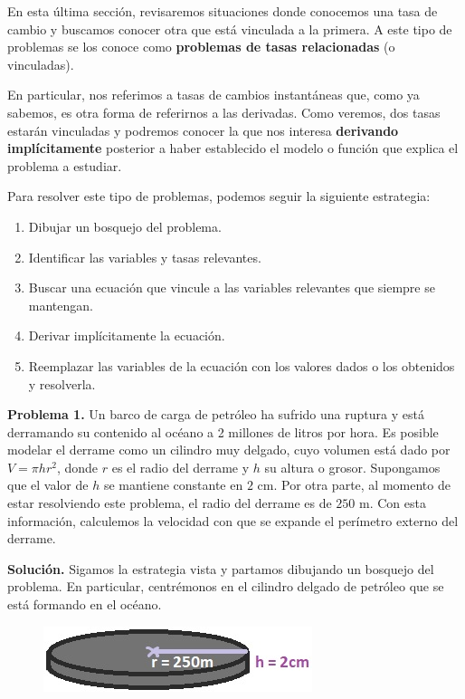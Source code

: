 \documentclass[12pt]{article}
\begin{document}
En esta última sección, revisaremos situaciones donde conocemos una tasa de cambio y buscamos conocer otra que está vinculada a la primera. A este tipo de problemas se los conoce como \textbf{problemas de tasas relacionadas} (o vinculadas).

En particular, nos referimos a tasas de cambios instantáneas que, como ya sabemos, es otra forma de referirnos a las derivadas. Como veremos, dos tasas estarán vinculadas y podremos conocer la que nos interesa \textbf{derivando implícitamente} posterior a haber establecido el modelo o función que explica el problema a estudiar.

Para resolver este tipo de problemas, podemos seguir la siguiente estrategia:

\begin{enumerate}
\item Dibujar un bosquejo del problema.

\item Identificar las variables y tasas relevantes.

\item Buscar una ecuación que vincule a las variables relevantes que siempre se mantengan.

\item Derivar implícitamente la ecuación.

\item Reemplazar las variables de la ecuación con los valores dados o los obtenidos y resolverla.
\end{enumerate}

\textbf{Problema 1.} \quad Un barco de carga de petróleo ha sufrido una ruptura y está derramando su contenido al océano a 2 millones de litros por hora. Es posible modelar el derrame como un cilindro muy delgado, cuyo volumen está dado por $V = \pi h r^{2}$, donde $r$ es el radio del derrame y $h$ su altura o grosor. Supongamos que el valor de $h$ se mantiene constante en $2$ cm. Por otra parte, al momento de estar resolviendo este problema, el radio del derrame es de $250$ m. Con esta información, calculemos la velocidad con que se expande el perímetro externo del derrame.

\textbf{Solución.} \quad Sigamos la estrategia vista y partamos dibujando un bosquejo del problema. En particular, centrémonos en el cilindro delgado de petróleo que se está formando en el océano.

\begin{figure}[hbt!]
\centering
\includegraphics[scale=0.7]{img/related-prob-1.jpg}
\end{figure}
\end{document}
